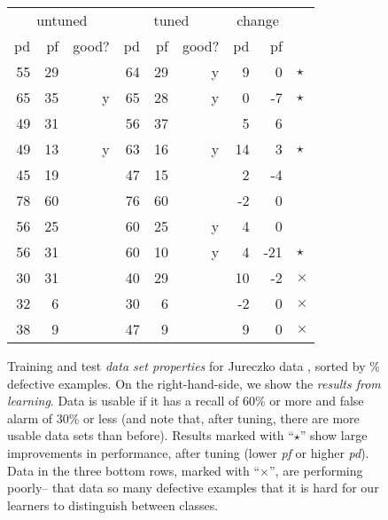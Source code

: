 \begin{figure*}[!t]
\begin{center}
\begin{minipage}{.4\linewidth}
\begin{tabular}{|rrr|rrr|rr|l}
				\multicolumn{3}{|c|}{untuned} & \multicolumn{3}{c|}{tuned} & \multicolumn{2}{c|}{change}\\
				\cline{1-8}
				
				pd & pf & good? & pd & pf & good? & pd & pf\\\cline{1-8}
				\rowcolor{celadon}55 & 29 &   & 64 & 29 & y & 9 & 0&$\star$\\
				\rowcolor{celadon}	65 & 35 & y & 65 & 28 & y & 0 & -7&$\star$\\
				49 & 31 &   & 56 & 37 &   & 5 & 6\\
				\rowcolor{celadon}	49 & 13 & y & 63 & 16 & y & 14 & 3&$\star$\\
				45 & 19 &   & 47 & 15 &   & 2 & -4\\
				78 & 60 &   & 76 & 60 &   & -2 & 0\\
				56 & 25 &   & 60 & 25 & y & 4 & 0\\
				\rowcolor{celadon}	56 & 31 &   & 60 & 10 & y & 4 & -21&$\star$\\
			\rowcolor{lavenderpink}	30 & 31 &   & 40 & 29 &   & 10 & -2&$\times$\\
				\rowcolor{lavenderpink}32 & 6 &   & 30 & 6 &   & -2 & 0&$\times$\\
				\rowcolor{lavenderpink}38 & 9 &   & 47 & 9 &   & 9 & 0&$\times$\\
				\hline 
			\end{tabular}
			
		\end{minipage}
	\end{center}    
	
	\caption{Training and test {\em data set properties} for  Jureczko data ,
		sorted by \% defective examples.
		On the right-hand-side, we show the {\em results from learning}.
		Data is usable if it has a recall of 60\% or more and false alarm of 30\% or less (and note that, after tuning, there are more usable data sets than before). Results  	\colorbox{celadon}{ marked with ``$\star$''} show large improvements in performance, after tuning
		(lower {\em pf} or higher {\em pd}).
		Data in  the  \colorbox{lavenderpink}{three bottom rows}, marked with ``$\times$'', are  performing
		poorly-- that data so many defective examples  that it  is hard for
		our learners to distinguish between classes.
	}\label{fig:j}
\end{figure*}
